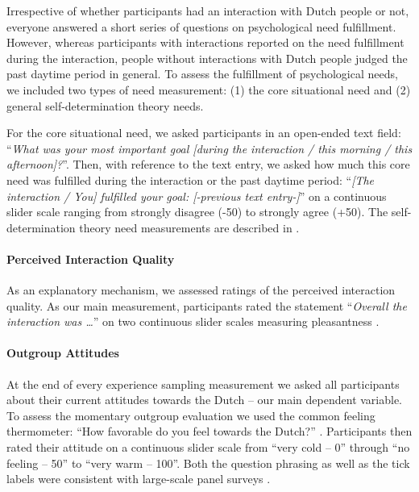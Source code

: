 Irrespective of whether participants had an interaction with Dutch
people or not, everyone answered a short series of questions on
psychological need fulfillment. However, whereas participants with
interactions reported on the need fulfillment during the interaction,
people without interactions with Dutch people judged the past daytime
period in general. To assess the fulfillment of psychological needs, we
included two types of need measurement: (1) the core situational need
and (2) general self-determination theory needs.

For the core situational need, we asked participants in an open-ended
text field:
``\textit{What was your most important goal [during the interaction / this morning / this afternoon]?}''.
Then, with reference to the text entry, we asked how much this core need
was fulfilled during the interaction or the past daytime period:
``\textit{[The interaction / You] fulfilled your goal: [-previous text entry-]}''
on a continuous slider scale ranging from strongly disagree (-50) to
strongly agree (+50). The self-determination theory need measurements
are described in .

\paragraph{Perceived Interaction Quality}

As an explanatory mechanism, we assessed ratings of the perceived
interaction quality. As our main measurement, participants rated the
statement ``\textit{Overall the interaction was …}'' on two continuous
slider scales measuring pleasantness
\citep[from unpleasant (-50) to pleasant (+50)) and meaningfulness (from superficial (-50) to meaningful (+50); both items adapted from][]{Downie2008}.

\paragraph{Outgroup Attitudes}

At the end of every experience sampling measurement we asked all
participants about their current attitudes towards the Dutch -- our main
dependent variable. To assess the momentary outgroup evaluation we used
the common feeling thermometer: ``How favorable do you feel towards the
Dutch?'' \citep[][]{Lavrakas2008}. Participants then rated their
attitude on a continuous slider scale from ``very cold -- 0'' through
``no feeling -- 50'' to ``very warm -- 100''. Both the question phrasing
as well as the tick labels were consistent with large-scale panel
surveys \citep[e.g.,][]{DeBell2010}.

